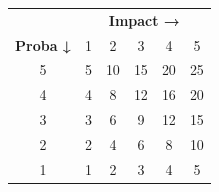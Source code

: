 \documentclass[11pt,a4paper,oneside]{report}
\begin{document}
\begin{center}
\renewcommand{\arraystretch}{1.6}
\begin{tabular}{c|ccccc}
 & \multicolumn{5}{c}{\textbf{Impact →}} \\
\textbf{Proba ↓} & 1 & 2 & 3 & 4 & 5 \\
\hline
5 & \cellcolor{cnOrange!40}5 & \cellcolor{cnOrange!40}10 & \cellcolor{cnRed!40}15 & \cellcolor{cnRed!40}20 & \cellcolor{cnRed!70}25 \\
4 & \cellcolor{cnGreen!30}4 & \cellcolor{cnOrange!40}8 & \cellcolor{cnOrange!40}12 & \cellcolor{cnRed!40}16 & \cellcolor{cnRed!40}20 \\
3 & \cellcolor{cnGreen!30}3 & \cellcolor{cnGreen!30}6 & \cellcolor{cnOrange!40}9 & \cellcolor{cnOrange!40}12 & \cellcolor{cnRed!40}15 \\
2 & \cellcolor{cnGreen!30}2 & \cellcolor{cnGreen!30}4 & \cellcolor{cnGreen!30}6 & \cellcolor{cnOrange!40}8 & \cellcolor{cnOrange!40}10 \\
1 & \cellcolor{cnGreen!30}1 & \cellcolor{cnGreen!30}2 & \cellcolor{cnGreen!30}3 & \cellcolor{cnGreen!30}4 & \cellcolor{cnGreen!30}5 \\
\end{tabular}
\end{center}
\end{document}
